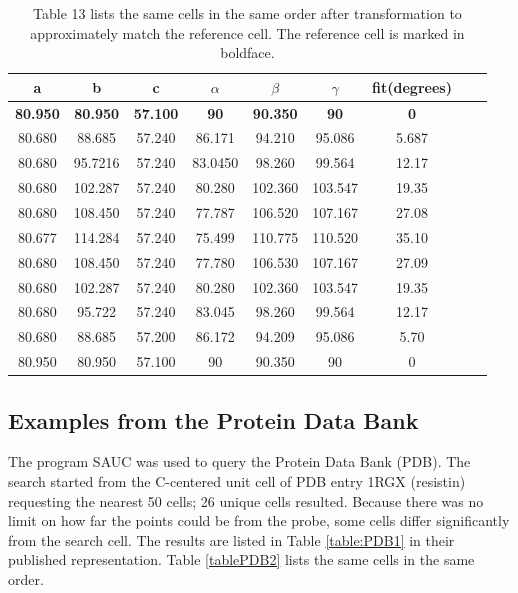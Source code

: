 \documentclass[preprint]{iucr}              %
\numberwithin{equation}{section}
\numberwithin{equation}{section}
\begin{document}
	
	\begin{table}
		\begin{center}
			\caption{Table 13 lists the same cells in the same order after transformation to approximately match the reference cell.
				The reference cell is marked in boldface.}
			\vspace{3mm}
			\begin{tabular}{ccccccccc}
				\toprule
 a & b & c & $\alpha$ & $\beta$ & $\gamma$ & fit(degrees) \\ \midrule         
\textbf{80.950} & \textbf{80.950}  &  \textbf{57.100}  & \textbf{90}  & \textbf{90.350}    & \textbf{90} & \textbf{0}  \\   
80.680 & 88.685  &  57.240  & 86.171  & 94.210    & 95.086 & 5.687  \\
80.680 & 95.7216  & 57.240  & 83.0450  & 98.260    & 99.564 &  12.17  \\
80.680 & 102.287 &  57.240 &  80.280 &  102.360  & 103.547 &  19.35  \\
80.680 & 108.450 &  57.240 &  77.787 &  106.520  & 107.167 & 27.08  \\
80.677 & 114.284 &  57.240 &  75.499 &  110.775  & 110.520 & 35.10  \\
80.680 & 108.450 &  57.240 &  77.780 &  106.530  & 107.167 & 27.09  \\
80.680 & 102.287 &  57.240 &  80.280 &  102.360  & 103.547 &  19.35  \\
80.680 & 95.722  &  57.240  & 83.045  & 98.260    & 99.564 &  12.17  \\
80.680 & 88.685  &  57.200  & 86.172  & 94.209    & 95.086 & 5.70  \\
80.950 & 80.950  &  57.100  & 90  & 90.350    & 90 & 0  \\
				\bottomrule
			\end{tabular}			
			\label{table:AD2}
		\end{center}
	\end{table}	
	
	\subsection{Examples from the Protein Data Bank}
	
	The program SAUC \cite{mcgill2014} was used to query the
	Protein Data Bank (PDB). The search started from the
	C-centered unit cell of PDB entry 1RGX (resistin) requesting the nearest 50 cells;
	26 unique cells resulted. Because there was no limit on
	how far the points could be from the probe, some cells
	differ significantly from the search cell. The results are listed
	in Table \ref{table:PDB1} in their published representation. Table \ref{tablePDB2} lists the same cells
	in the same order.
	
\end{document}
